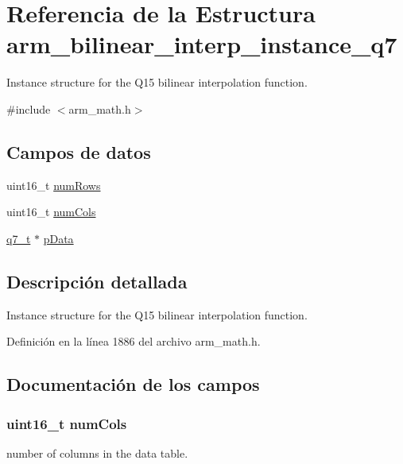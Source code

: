 \hypertarget{structarm__bilinear__interp__instance__q7}{}\section{Referencia de la Estructura arm\+\_\+bilinear\+\_\+interp\+\_\+instance\+\_\+q7}
\label{structarm__bilinear__interp__instance__q7}


Instance structure for the Q15 bilinear interpolation function.  




{\ttfamily \#include $<$arm\+\_\+math.\+h$>$}

\subsection*{Campos de datos}
\begin{DoxyCompactItemize}
\item 
uint16\+\_\+t \hyperlink{structarm__bilinear__interp__instance__q7_a1bcf80ccdc2acc29198f1592ae300390}{num\+Rows}
\item 
uint16\+\_\+t \hyperlink{structarm__bilinear__interp__instance__q7_a4bb5ec0d13eb4c9cf887aa8366a44117}{num\+Cols}
\item 
\hyperlink{arm__math_8h_ae541b6f232c305361e9b416fc9eed263}{q7\+\_\+t} $\ast$ \hyperlink{structarm__bilinear__interp__instance__q7_afde7546ea2ec5df9fe42fb04d128a016}{p\+Data}
\end{DoxyCompactItemize}


\subsection{Descripción detallada}
Instance structure for the Q15 bilinear interpolation function. 

Definición en la línea 1886 del archivo arm\+\_\+math.\+h.



\subsection{Documentación de los campos}
\subsubsection[{\texorpdfstring{num\+Cols}{numCols}}]{\setlength{\rightskip}{0pt plus 5cm}uint16\+\_\+t num\+Cols}\hypertarget{structarm__bilinear__interp__instance__q7_a4bb5ec0d13eb4c9cf887aa8366a44117}{}\label{structarm__bilinear__interp__instance__q7_a4bb5ec0d13eb4c9cf887aa8366a44117}
number of columns in the data table. 

